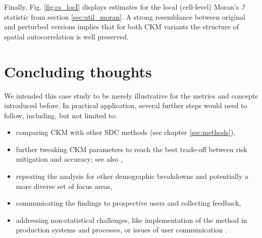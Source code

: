 Finally, Fig. \ref{fig:cs_locI} displays estimates for the local (cell-level) Moran's $\mathcal{I}$ statistic from section \ref{sec:util_moran}. A strong resemblance between original and perturbed versions implies that for both CKM variants the structure of spatial autocorrelation is well preserved.

\section{Concluding thoughts}

We intended this case study to be merely illustrative for the metrics and concepts introduced before. In practical application, several further steps would need to follow, including, but not limited to:
\begin{itemize}
    \item comparing CKM with other SDC methods (see chapter \ref{sec:methods}),
    \item further tweaking CKM parameters to reach the best trade-off between risk mitigation and accuracy; see also \citet[~ch.4]{Guidelines3_CensusDemog},
    \item repeating the analysis for other demographic breakdowns and potentially a more diverse set of focus areas,
    \item communicating the findings to prospective users and collecting feedback,
    \item addressing non-statistical challenges, like implementation of the method in production systems and processes, or issues of user communication \citep[~ch.5]{Guidelines3_CensusDemog}.
\end{itemize}

